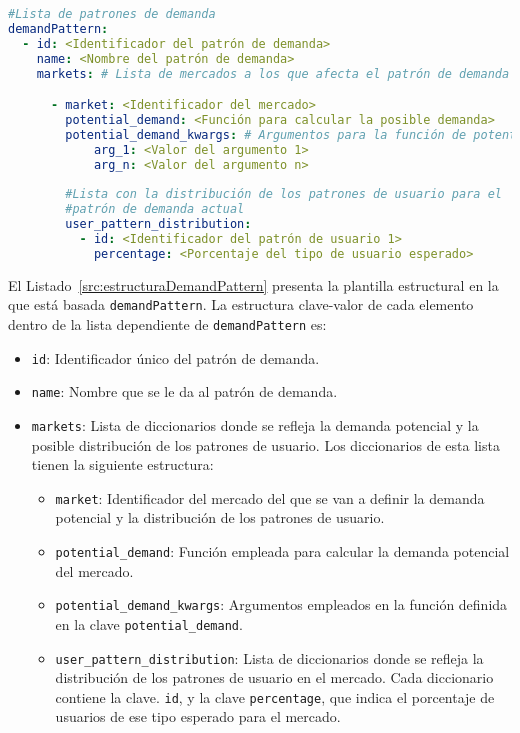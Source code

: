 \begin{lstlisting}[language=YAML,
                   frame=none,
                   numbers=none,
                   basicstyle=\ttfamily\normalsize,
                   caption={Estructura de la clave raíz \texttt{demandPattern}},
                   label=src:estructuraDemandPattern,
                   inputencoding=utf8]
#Lista de patrones de demanda    
demandPattern:
  - id: <Identificador del patrón de demanda>
    name: <Nombre del patrón de demanda>
    markets: # Lista de mercados a los que afecta el patrón de demanda

      - market: <Identificador del mercado>
        potential_demand: <Función para calcular la posible demanda>
        potential_demand_kwargs: # Argumentos para la función de potential_demand
            arg_1: <Valor del argumento 1> 
            arg_n: <Valor del argumento n>
            
        #Lista con la distribución de los patrones de usuario para el
        #patrón de demanda actual        
        user_pattern_distribution:
          - id: <Identificador del patrón de usuario 1>
            percentage: <Porcentaje del tipo de usuario esperado>
\end{lstlisting}

El Listado~\ref{src:estructuraDemandPattern} presenta la plantilla estructural en la que está basada \texttt{demandPattern}. La estructura clave-valor de cada elemento dentro de la lista dependiente de \texttt{demandPattern} es:

\begin{itemize}
    \item \texttt{id}: Identificador único del patrón de demanda.
    \item \texttt{name}: Nombre que se le da al patrón de demanda.
    \item \texttt{markets}: Lista de diccionarios donde se refleja la demanda potencial y la posible distribución de los patrones de usuario. Los diccionarios de esta lista tienen la siguiente estructura:
    \begin{itemize}
        \item \texttt{market}: Identificador del mercado del que se van a definir la demanda potencial y la distribución de los patrones de usuario.
        \item \texttt{potential\_demand}: Función empleada para calcular la demanda potencial del mercado.
        \item \texttt{potential\_demand\_kwargs}: Argumentos empleados en la función definida en la clave \texttt{potential\_demand}.
        \item \texttt{user\_pattern\_distribution}: Lista de diccionarios donde se refleja la distribución de los patrones de usuario en el mercado. Cada diccionario contiene la clave. \texttt{id}, y la clave \texttt{percentage}, que indica el porcentaje de usuarios de ese tipo esperado para el mercado.
    \end{itemize}
\end{itemize}

